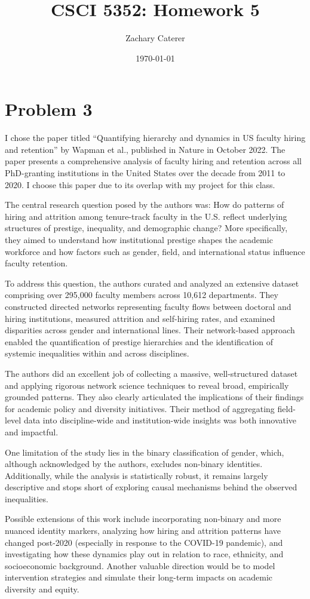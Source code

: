 \documentclass[12pt]{article}
\title{CSCI 5352: Homework 5}
\author{
    Zachary Caterer %
}
\date{\today}
\begin{document}
\maketitle

\section*{Problem 3}

I chose the paper titled ``Quantifying hierarchy and dynamics in US faculty hiring and retention'' by Wapman et al., published in Nature in October 2022. The paper presents a comprehensive analysis of faculty hiring and retention across all PhD-granting institutions in the United States over the decade from 2011 to 2020. I choose this paper due to its overlap with my project for this class. 

The central research question posed by the authors was: How do patterns of hiring and attrition among tenure-track faculty in the U.S. reflect underlying structures of prestige, inequality, and demographic change? More specifically, they aimed to understand how institutional prestige shapes the academic workforce and how factors such as gender, field, and international status influence faculty retention.

To address this question, the authors curated and analyzed an extensive dataset comprising over 295,000 faculty members across 10,612 departments. They constructed directed networks representing faculty flows between doctoral and hiring institutions, measured attrition and self-hiring rates, and examined disparities across gender and international lines. Their network-based approach enabled the quantification of prestige hierarchies and the identification of systemic inequalities within and across disciplines.

The authors did an excellent job of collecting a massive, well-structured dataset and applying rigorous network science techniques to reveal broad, empirically grounded patterns. They also clearly articulated the implications of their findings for academic policy and diversity initiatives. Their method of aggregating field-level data into discipline-wide and institution-wide insights was both innovative and impactful.

One limitation of the study lies in the binary classification of gender, which, although acknowledged by the authors, excludes non-binary identities. Additionally, while the analysis is statistically robust, it remains largely descriptive and stops short of exploring causal mechanisms behind the observed inequalities.

Possible extensions of this work include incorporating non-binary and more nuanced identity markers, analyzing how hiring and attrition patterns have changed post-2020 (especially in response to the COVID-19 pandemic), and investigating how these dynamics play out in relation to race, ethnicity, and socioeconomic background. Another valuable direction would be to model intervention strategies and simulate their long-term impacts on academic diversity and equity.
\end{document}
